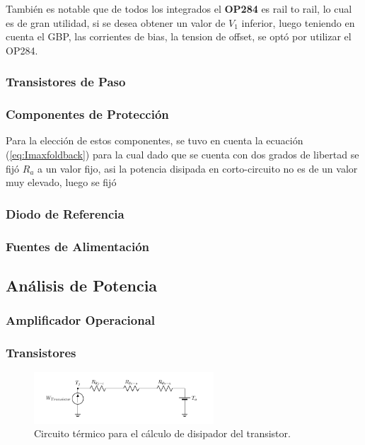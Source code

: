 También es notable que de todos los integrados el \textbf{OP284} es rail to rail, lo cual es de gran utilidad, si se desea obtener un valor de $V_1$ inferior, luego teniendo en cuenta el GBP, las corrientes de bias, la tension de offset, se optó por utilizar el OP284.
\subsubsection{Transistores de Paso}
\subsubsection{Componentes de Protección}
Para la elección de estos componentes, se tuvo en cuenta la ecuación (\ref{eq:Imaxfoldback}) para la cual dado que se cuenta con dos grados de libertad se fijó $R_a$ a un valor fijo, asi la potencia disipada en corto-circuito no es de un valor muy elevado, luego se fijó 
\subsubsection{Diodo de Referencia}
\subsubsection{Fuentes de Alimentación}

\subsection{Análisis de Potencia}
\subsubsection{Amplificador Operacional}
\subsubsection{Transistores}

\begin{figure}[H]
\centering
	\includegraphics[width=0.6\textwidth, page=1]{ImagenesEjercicio2/Potencia - Transistor.pdf}
	\caption{Circuito térmico para el cálculo de disipador del transistor.}
	\label{fig:circuitopottrans}
\end{figure}


